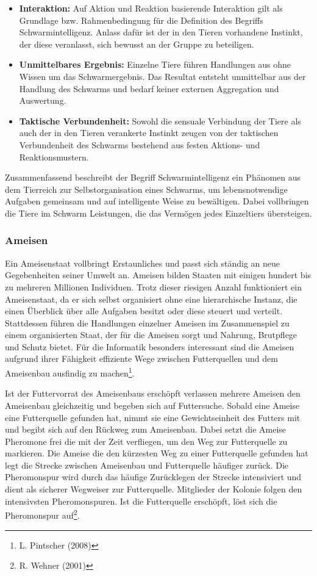 \documentclass[a4paper, 11pt]{article}
\begin{document}
\begin{itemize}
	\item \textbf{Interaktion:} Auf Aktion und Reaktion basierende Interaktion gilt als Grundlage bzw. Rahmenbedingung für die Definition des Begriffs Schwarmintelligenz. Anlass dafür ist der in den Tieren vorhandene Instinkt, der diese veranlasst, sich bewusst an der Gruppe zu beteiligen.
	\item \textbf{Unmittelbares Ergebnis:} Einzelne Tiere führen Handlungen aus ohne Wissen um das Schwarmergebnis. Das Resultat entsteht unmittelbar aus der Handlung des Schwarms und bedarf keiner externen Aggregation und Auswertung.
	\item \textbf{Taktische Verbundenheit:} Sowohl die sensuale Verbindung der Tiere als auch der in den Tieren verankerte Instinkt zeugen von der taktischen Verbundenheit des Schwarms bestehend aus festen Aktions- und Reaktionsmustern. 
\end{itemize}
\par Zusammenfassend beschreibt der Begriff Schwarmintelligenz ein Phänomen aus dem Tierreich zur Selbstorganisation eines Schwarms, um lebensnotwendige Aufgaben gemeinsam und auf intelligente Weise zu bewältigen. Dabei vollbringen die Tiere im Schwarm Leistungen, die das Vermögen jedes Einzeltiers übersteigen.
\subsubsection{Ameisen}
Ein Ameisenstaat vollbringt Erstaunliches und passt sich ständig an neue Gegebenheiten seiner Umwelt an. Ameisen bilden Staaten mit einigen hundert bis zu mehreren Millionen Individuen. Trotz dieser riesigen Anzahl funktioniert ein Ameisenstaat, da er sich selbst organisiert ohne eine hierarchische Instanz, die einen Überblick über alle Aufgaben besitzt oder diese steuert und verteilt. Stattdessen führen die Handlungen einzelner Ameisen im Zusammenspiel zu einem organisierten Staat, der für die Ameisen sorgt und Nahrung, Brutpflege und Schutz bietet. Für die Informatik besonders interessant sind die Ameisen aufgrund ihrer Fähigkeit effiziente Wege zwischen Futterquellen und dem Ameisenbau ausfindig zu machen\footnote{L. Pintscher (2008)}.
\par Ist der Futtervorrat des Ameisenbaus erschöpft verlassen mehrere Ameisen den Ameisenbau gleichzeitig und begeben sich auf Futtersuche. Sobald eine Ameise eine Futterquelle gefunden hat, nimmt sie eine Gewichtseinheit des Futters mit und begibt sich auf den Rückweg zum Ameisenbau. Dabei setzt die Ameise Pheromone frei die mit der Zeit verfliegen, um den Weg zur Futterquelle zu markieren. Die Ameise die den kürzesten Weg zu einer Futterquelle gefunden hat legt die Strecke zwischen Ameisenbau und Futterquelle häufiger zurück.  Die Pheromonspur wird durch das häufige Zurücklegen der Strecke intensiviert und dient als sicherer Wegweiser zur Futterquelle. Mitglieder der Kolonie folgen den intensivsten Pheromonspuren. Ist die Futterquelle erschöpft, löst sich die Pheromonspur auf\footnote{R. Wehner (2001)}.
\end{document}
